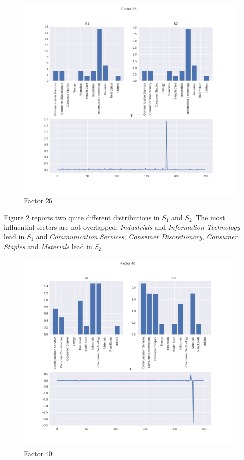 \documentclass[12pt]{extarticle}
\begin{document}
\begin{figure}[h]
	\centering
	\includegraphics[width=\textwidth]{factor_26.png}
	\caption{Factor 26.} 
	\label{fig:f26}
\end{figure}

Figure \ref{fig:f40} reports two quite different distributions in $S_1$ and $S_2$. The most influential sectors are not overlapped: \textit{Industrials} and \textit{Information Technology} lead in $S_1$ and \textit{Communication Services}, \textit{Consumer Discretionary}, \textit{Consumer Staples} and \textit{Materials} lead in $S_2$.

\begin{figure}[h]
	\centering
	\includegraphics[width=0.99\textwidth]{factor_40.png}
	\caption{Factor 40.} 
	\label{fig:f40}
\end{figure}
\end{document}
